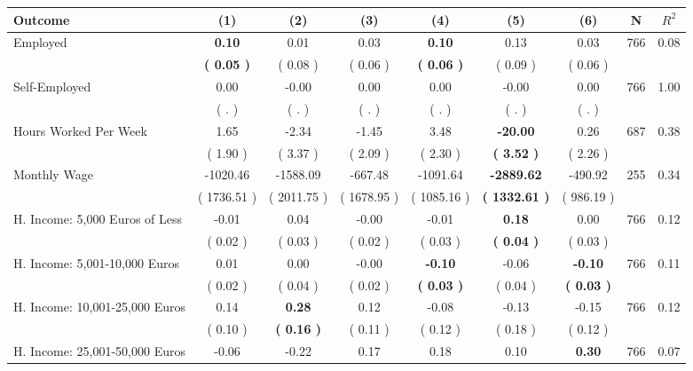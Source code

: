 \begin{tabular}{lcccccccc}
\toprule
 \textbf{Outcome} & \textbf{(1)} & \textbf{(2)} & \textbf{(3)} & \textbf{(4)} & \textbf{(5)} & \textbf{(6)} & \textbf{N} & \textbf{$ R^2$} \\
\midrule
Employed & \textbf{     0.10} &      0.01 &      0.03 & \textbf{     0.10} &      0.13 &      0.03 & 766 &       0.08 \\ 
 & \textbf{(     0.05 )} & (     0.08 ) & (     0.06 ) & \textbf{(     0.06 )} & (     0.09 ) & (     0.06 ) & \\
Self-Employed &      0.00 &     -0.00 &      0.00 &      0.00 &     -0.00 &      0.00 & 766 &       1.00 \\ 
 & (        . ) & (        . ) & (        . ) & (        . ) & (        . ) & (        . ) & \\
Hours Worked Per Week &      1.65 &     -2.34 &     -1.45 &      3.48 & \textbf{   -20.00} &      0.26 & 687 &       0.38 \\ 
 & (     1.90 ) & (     3.37 ) & (     2.09 ) & (     2.30 ) & \textbf{(     3.52 )} & (     2.26 ) & \\
Monthly Wage &  -1020.46 &  -1588.09 &   -667.48 &  -1091.64 & \textbf{ -2889.62} &   -490.92 & 255 &       0.34 \\ 
 & (  1736.51 ) & (  2011.75 ) & (  1678.95 ) & (  1085.16 ) & \textbf{(  1332.61 )} & (   986.19 ) & \\
H. Income: 5,000 Euros of Less &     -0.01 &      0.04 &     -0.00 &     -0.01 & \textbf{     0.18} &      0.00 & 766 &       0.12 \\ 
 & (     0.02 ) & (     0.03 ) & (     0.02 ) & (     0.03 ) & \textbf{(     0.04 )} & (     0.03 ) & \\
H. Income: 5,001-10,000 Euros &      0.01 &      0.00 &     -0.00 & \textbf{    -0.10} &     -0.06 & \textbf{    -0.10} & 766 &       0.11 \\ 
 & (     0.02 ) & (     0.04 ) & (     0.02 ) & \textbf{(     0.03 )} & (     0.04 ) & \textbf{(     0.03 )} & \\
H. Income: 10,001-25,000 Euros &      0.14 & \textbf{     0.28} &      0.12 &     -0.08 &     -0.13 &     -0.15 & 766 &       0.12 \\ 
 & (     0.10 ) & \textbf{(     0.16 )} & (     0.11 ) & (     0.12 ) & (     0.18 ) & (     0.12 ) & \\
H. Income: 25,001-50,000 Euros &     -0.06 &     -0.22 &      0.17 &      0.18 &      0.10 & \textbf{     0.30} & 766 &       0.07 \\ 

\end{tabular}
